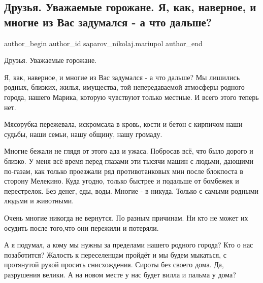 





\subsection{Друзья. Уважаемые горожане.  Я, как, наверное, и многие из Вас задумался - а что дальше?}
\label{sec:20_03_2022.fb.saparov_nikolaj.mariupol.1.druzya__uvazhaemie_g}

\ifcmt
 author_begin
   author_id saparov_nikolaj.mariupol
 author_end
\fi

Друзья. Уважаемые горожане.

Я, как, наверное, и многие из Вас задумался - а что дальше? Мы лишились
родных, близких, жилья, имущества, той непередаваемой атмосферы родного
города, нашего Марика, которую чувствуют только местные. И всего этого теперь
нет.

Мясорубка пережевала, искромсала в кровь, кости и бетон с кирпичом наши
судьбы, наши семьи, нашу общину, нашу громаду.

Многие бежали не глядя от этого ада и ужаса. Побросав всё, что было дорого и
близко. У меня всё время перед глазами эти тысячи машин с людьми, дающими
по-газам, как только проезжали ряд противотанковых  мин после блокпоста в
сторону Мелекино. Куда угодно, только быстрее и подальше от бомбежек и
перестрелок. Без денег, еды, воды. Многие - в никуда. Только с самыми родными
людьми и животными.

Очень многие никогда не вернутся. По разным причинам. Ни кто не может их
осудить после того,что они пережили и потеряли.

А я подумал, а кому мы нужны за пределами нашего родного города? Кто о нас
позаботится? Жалость к переселенцам пройдёт и мы будем мыкаться, с
протянутой рукой просить снисхождения. Сироты без своего дома. Да, разрушения
велики. А на новом месте у нас будет вилла и пальма у дома?

